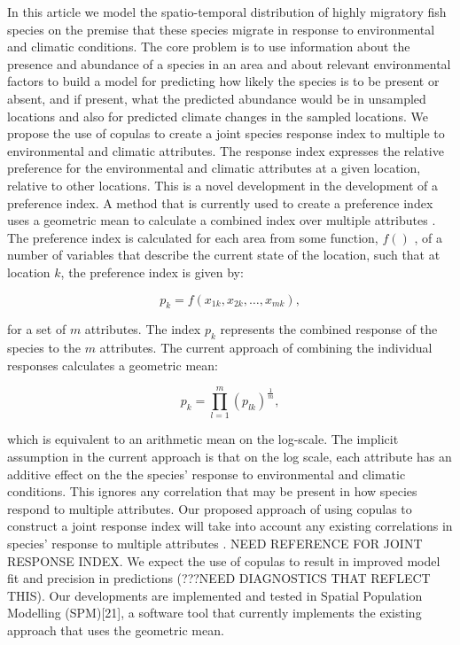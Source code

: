 \documentclass[review]{elsarticle}
\begin{document}
	In this article we model the spatio-temporal distribution of highly migratory fish species on the premise that these species migrate in response to environmental and climatic conditions.  The core problem is to use information about the presence and abundance of a species in an area and about relevant environmental factors to build a model for predicting how likely the species is to be present or absent, and if present, what the predicted abundance would be in unsampled locations and also for predicted climate changes in the sampled locations.  We propose the use of copulas to create a joint species response index to multiple to environmental and climatic attributes. The response index expresses the relative preference for the environmental and climatic attributes at a given location, relative to other locations.  This is a novel development in the development of a preference index.   
A method that is currently used to create a preference index uses a geometric mean to calculate a combined index over multiple attributes \citep{bentley2004}. The preference index is calculated for each area from some function, $f()$ , of a number of variables that describe the current state of the location, such that at location $k$, the preference index  is given by:

$$p_k = f(x_{1k}, x_{2k}, \ldots, x_{mk}),$$

for a set of $m$ attributes.  The index $p_k$ represents the combined response of the species to the $m$ attributes.  The current approach of combining the individual responses calculates a geometric mean:

$$p_k = \prod_{l=1}^m \left(p_{lk}\right)^{\frac{1}{m}},$$

which is equivalent to an arithmetic mean on the log-scale.  The implicit assumption in the current approach is that on the log scale, each attribute has an additive effect on the the species' response to environmental and climatic conditions. This ignores any correlation that may be present in how species respond to multiple attributes.  Our proposed approach of using copulas to construct a joint response index will take into account any existing correlations in species' response to multiple attributes \citep{}. NEED REFERENCE FOR JOINT RESPONSE INDEX.  We expect the use of copulas to result in improved model fit and precision in predictions (???NEED DIAGNOSTICS THAT REFLECT THIS).
Our developments are implemented and tested in Spatial Population Modelling (SPM)\citep{dunn2012}[21], a software tool that currently implements the existing approach that uses the geometric mean.
		
\end{document}
